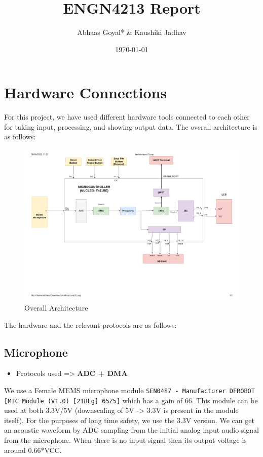 \documentclass[11pt]{article}
\author{Abhaas Goyal* \& Kaushiki Jadhav}
\date{\today}
\title{ENGN4213 Report}
\begin{document}
\maketitle
\setlength\parindent{0pt}


\section{Hardware Connections}
\label{sec:orgfb0b5ae}
For this project, we have used different hardware tools connected to each other for taking input, processing, and showing output data. The overall architecture is as follows:

\begin{figure}[H]
    \centering
    \includegraphics[width=1\textwidth, trim={0cm 5cm 0cm 1cm}, clip]{Architecture.pdf}
    \caption{Overall Architecture}
    \end{figure}

The hardware and the relevant protocols are as follows:
\subsection{Microphone}
\label{sec:orgb241077}

\begin{itemize}
\item Protocols used => \textbf{ADC + DMA}
\end{itemize}

We use a Female MEMS microphone module \texttt{SEN0487 - Manufacturer DFROBOT [MIC Module (V1.0) [21BLg] 65Z5]} which has a gain of 66. This module can be used at both 3.3V/5V (downscaling of 5V -> 3.3V is present in the module itself). For the purposes of long time safety, we use the 3.3V version. We can get an acoustic waveform by ADC sampling from the initial analog input audio signal from the microphone. When there is no input signal then its output voltage is around 0.66*VCC. \\
\end{document}
